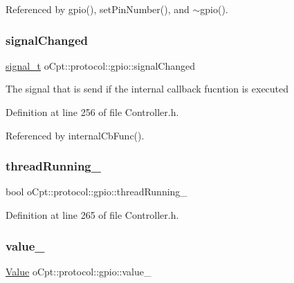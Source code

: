 Referenced by gpio(), set\+Pin\+Number(), and $\sim$gpio().

\hypertarget{classo_cpt_1_1protocol_1_1gpio_aa24b7c7d759f783bc3e93745edc69a2b}{}\label{classo_cpt_1_1protocol_1_1gpio_aa24b7c7d759f783bc3e93745edc69a2b} 
\subsubsection{\texorpdfstring{signal\+Changed}{signalChanged}}
{\footnotesize\ttfamily \hyperlink{classo_cpt_1_1protocol_1_1gpio_aa875802b20c7ef999c44af68e7f23621}{signal\+\_\+t} o\+Cpt\+::protocol\+::gpio\+::signal\+Changed}

The signal that is send if the internal callback fucntion is executed 

Definition at line 256 of file Controller.\+h.



Referenced by internal\+Cb\+Func().

\hypertarget{classo_cpt_1_1protocol_1_1gpio_aefa2c3a350dce68af5b9eea8b84f0336}{}\label{classo_cpt_1_1protocol_1_1gpio_aefa2c3a350dce68af5b9eea8b84f0336} 
\subsubsection{\texorpdfstring{thread\+Running\+\_\+}{threadRunning\_}}
{\footnotesize\ttfamily bool o\+Cpt\+::protocol\+::gpio\+::thread\+Running\+\_\+\hspace{0.3cm}{\ttfamily [private]}}



Definition at line 265 of file Controller.\+h.

\hypertarget{classo_cpt_1_1protocol_1_1gpio_a301d39638a420a299728d353ade3997c}{}\label{classo_cpt_1_1protocol_1_1gpio_a301d39638a420a299728d353ade3997c} 
\subsubsection{\texorpdfstring{value\+\_\+}{value\_}}
{\footnotesize\ttfamily \hyperlink{classo_cpt_1_1protocol_1_1gpio_a7d2d1d34f177f209ad642098d168656f}{Value} o\+Cpt\+::protocol\+::gpio\+::value\+\_\+\hspace{0.3cm}{\ttfamily [private]}}




